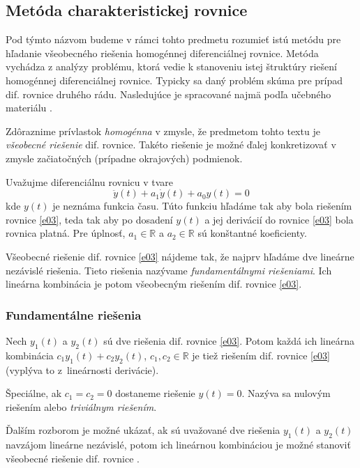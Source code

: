 \documentclass[a4paper, 10pt, ]{article}
\begin{document}
\subsection{Metóda charakteristickej rovnice}

Pod týmto názvom budeme v rámci tohto predmetu rozumieť istú metódu pre hľadanie všeobecného riešenia homogénnej diferenciálnej rovnice. Metóda vychádza z analýzy problému, ktorá vedie k stanoveniu istej štruktúry riešení homogénnej diferenciálnej rovnice. Typicky sa daný problém skúma pre prípad dif. rovnice druhého rádu. Nasledujúce je spracované najmä podľa učebného materiálu \cite{Mihalikova2012}.

Zdôraznime prívlastok \emph{homogénna} v zmysle, že predmetom tohto textu je \emph{všeobecné riešenie} dif. rovnice. Takéto riešenie je možné ďalej konkretizovať v zmysle začiatočných (prípadne okrajových) podmienok. 

Uvažujme diferenciálnu rovnicu v tvare
\begin{equation}
    \ddot y(t) + a_1 \dot y(t) + a_0 y(t) = 0 \label{e03}
\end{equation}
kde $y(t)$ je neznáma funkcia času. Túto funkciu hľadáme tak aby bola riešením rovnice \eqref{e03}, teda tak aby po dosadení $y(t)$ a jej derivácií do rovnice \eqref{e03} bola rovnica platná. Pre úplnosť, $a_1 \in \mathbb R$ a $a_2  \in \mathbb R$ sú konštantné koeficienty.

Všeobecné riešenie dif. rovnice \eqref{e03} nájdeme tak, že najprv hľadáme dve lineárne nezávislé riešenia. Tieto riešenia nazývame \emph{fundamentálnymi riešeniami}. Ich lineárna kombinácia je potom všeobecným riešením dif. rovnice \eqref{e03}.



\subsubsection{Fundamentálne riešenia}

Nech $y_1(t)$ a $y_2(t)$ sú dve riešenia dif. rovnice \eqref{e03}. Potom každá ich lineárna kombinácia $c_1 y_1(t) + c_2 y_2(t) $, $c_1, c_2 \in \mathbb R$ je tiež riešením dif. rovnice \eqref{e03} (vyplýva to z~lineárnosti derivácie). 

Špeciálne, ak $c_1 = c_2 = 0$ dostaneme riešenie $y(t) = 0$. Nazýva sa nulovým riešením alebo \emph{triviálnym riešením}.

Ďalším rozborom je možné ukázať, ak sú uvažované dve riešenia $y_1(t)$ a $y_2(t)$ navzájom lineárne nezávislé, potom ich lineárnou kombináciou je možné stanoviť všeobecné riešenie dif. rovnice \cite{Mihalikova2012}. 
\end{document}
